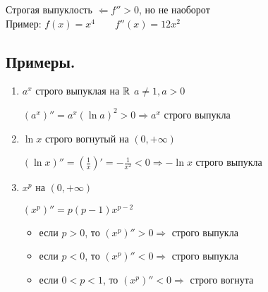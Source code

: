 \notice \; Строгая выпуклость $\Longleftarrow f'' > 0$, но не наоборот \\
Пример: $f(x) = x^4 \qquad f''(x) = 12x^2$

\subsection*{Примеры.}
\begin{enumerate}
    \item $a^x$ строго выпуклая на $\mathbb{R}$ \qquad $a \neq 1, a > 0$
    
    $(a^x)'' = a^x(\ln{a})^2 > 0 \Longrightarrow a^x$ строго выпукла
    \item $\ln{x}$ строго вогнутый на $(0, +\infty)$
    
    $(\ln{x})'' = (\frac{1}{x})' = - \frac{1}{x^2} < 0 \Longrightarrow - \ln{x}$ строго выпукла
    \item $x^p$ на $(0, +\infty)$
    
    $(x^p)'' = p(p - 1)x^{p - 2}$ 

    \begin{itemize}
        \item[] если $p > 0$, то $(x^p)'' > 0 \Longrightarrow$ строго выпукла
        \item[] если $p < 0$, то $(x^p)'' < 0 \Longrightarrow$ строго выпукла 
        \item[] если $0 < p < 1$, то $(x^p)'' < 0 \Longrightarrow$ строго вогнута
    \end{itemize}
\end{enumerate}
